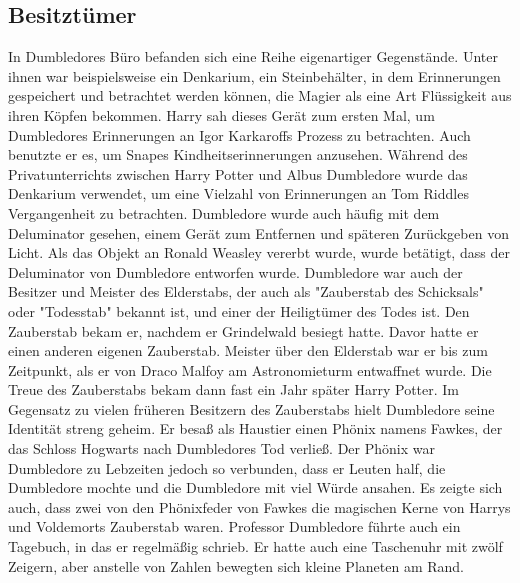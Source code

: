 \documentclass[a4paper, 10pt]{article}
\begin{document}
\subsection*{\Large Besitztümer}
In Dumbledores Büro befanden sich eine Reihe eigenartiger Gegenstände. Unter ihnen war beispielsweise ein Denkarium, ein Steinbehälter, in dem Erinnerungen gespeichert und betrachtet werden können, die Magier als eine Art Flüssigkeit aus ihren Köpfen bekommen. Harry sah dieses Gerät zum ersten Mal, um Dumbledores Erinnerungen an Igor Karkaroffs Prozess zu betrachten. Auch benutzte er es, um Snapes Kindheitserinnerungen anzusehen. Während des Privatunterrichts zwischen Harry Potter und Albus Dumbledore wurde das Denkarium verwendet, um eine Vielzahl von Erinnerungen an Tom Riddles Vergangenheit zu betrachten.
\vspace{10pt}
\newline
{}  
Dumbledore wurde auch häufig mit dem Deluminator gesehen, einem Gerät zum Entfernen und späteren Zurückgeben von Licht. Als das Objekt an Ronald Weasley vererbt wurde, wurde betätigt, dass der Deluminator von Dumbledore entworfen wurde. Dumbledore war auch der Besitzer und Meister des Elderstabs, der auch als "Zauberstab des Schicksals" oder "Todesstab" bekannt ist, und einer der Heiligtümer des Todes ist. Den Zauberstab bekam er, nachdem er Grindelwald besiegt hatte. Davor hatte er einen anderen eigenen Zauberstab. Meister über den Elderstab war er bis zum Zeitpunkt, als er von Draco Malfoy am Astronomieturm entwaffnet wurde. Die Treue des Zauberstabs bekam dann fast ein Jahr später Harry Potter. Im Gegensatz zu vielen früheren Besitzern des Zauberstabs hielt Dumbledore seine Identität streng geheim.
\vspace{10pt}
\newline
{}  
Er besaß als Haustier einen Phönix namens Fawkes, der das Schloss Hogwarts nach Dumbledores Tod verließ. Der Phönix war Dumbledore zu Lebzeiten jedoch so verbunden, dass er Leuten half, die Dumbledore mochte und die Dumbledore mit viel Würde ansahen. Es zeigte sich auch, dass zwei von den Phönixfeder von Fawkes die magischen Kerne von Harrys und Voldemorts Zauberstab waren.
\vspace{10pt}
\newline
{}  
Professor Dumbledore führte auch ein Tagebuch, in das er regelmäßig schrieb. Er hatte auch eine Taschenuhr mit zwölf Zeigern, aber anstelle von Zahlen bewegten sich kleine Planeten am Rand.
\end{document}
